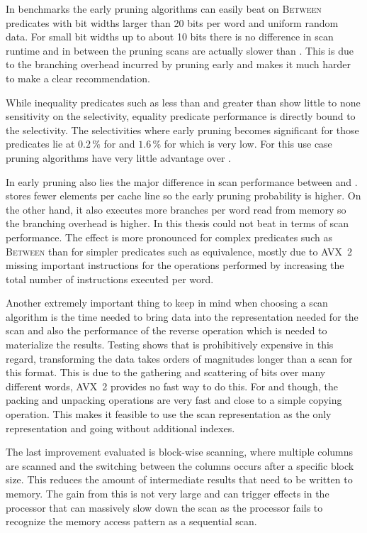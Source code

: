 In benchmarks the early pruning algorithms can easily beat \simdscan{} on
\textsc{Between} predicates with bit widths larger than 20 bits per word and
uniform random data. For small bit widths up to about 10 bits there is no
difference in scan runtime and in between the pruning scans are actually slower
than \simdscan{}. This is due to the branching overhead incurred by pruning
early and makes it much harder to make a clear recommendation.

While inequality predicates such as less than and greater than show little to
none sensitivity on the selectivity, equality predicate performance is directly
bound to the selectivity. The selectivities where early pruning becomes
significant for those predicates lie at $0.2\,\%$ for \bwv{} and $1.6\,\%$ for
\bs{} which is very low. For this use case pruning algorithms have very little
advantage over \simdscan{}.

In early pruning also lies the major difference in scan performance between
\bwv{} and \bs{}. \bs{} stores fewer elements per cache line so the early
pruning probability is higher. On the other hand, it also executes more
branches per word read from memory so the branching overhead is higher. In this
thesis \bs{} could not beat \bwv{} in terms of scan performance. The effect is
more pronounced for complex predicates such as \textsc{Between} than for
simpler predicates such as equivalence, mostly due to AVX~2 missing important
instructions for the operations performed by \bs{} increasing the total number
of instructions executed per word.

Another extremely important thing to keep in mind when choosing a scan
algorithm is the time needed to bring data into the representation needed for
the scan and also the performance of the reverse operation which is needed to
materialize the results. Testing shows that \bwv{} is prohibitively expensive
in this regard, transforming the data takes orders of magnitudes longer than a
scan for this format. This is due to the gathering and scattering of bits over
many different words, AVX~2 provides no fast way to do this. For \simdscan{}
and \bs{} though, the packing and unpacking operations are very fast and close
to a simple copying operation. This makes it feasible to use the scan
representation as the only representation and going without additional indexes.

The last improvement evaluated is block-wise scanning, where multiple columns
are scanned and the switching between the columns occurs after a specific block
size. This reduces the amount of intermediate results that need to be written
to memory. The gain from this is not very large and can trigger effects in the
processor that can massively slow down the scan as the processor fails to
recognize the memory access pattern as a sequential scan.


